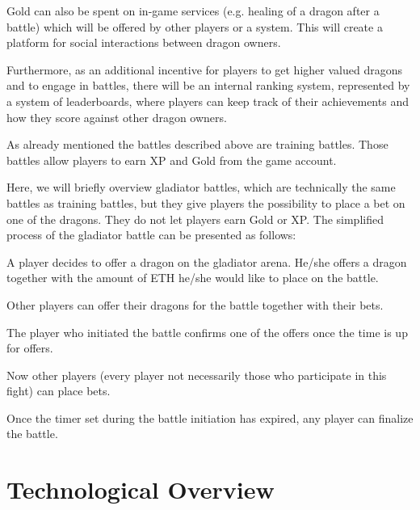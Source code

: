 \documentclass[12pt]{article}
\begin{document}
Gold can also be spent on in-game services (e.g. healing of a dragon after a battle) which will be offered by other players or a system. This will create a platform for social interactions between dragon owners.\par

Furthermore, as an additional incentive for players to get higher valued dragons and to engage in battles, there will be an internal ranking system, represented by a system of leaderboards, where players can keep track of their achievements and how they score against other dragon owners.\par

As already mentioned the battles described above are training battles. Those battles allow players to earn XP and Gold from the game account.\par

Here, we will briefly overview gladiator battles, which are technically the same battles as training battles, but they give players the possibility to place a bet on one of the dragons. They do not let players earn Gold or XP. The simplified process of the gladiator battle can be presented as follows:\par


\begin{itemize}
  \begin{samepage}
    \item A player decides to offer a dragon on the gladiator arena. He/she offers a dragon together with the amount of ETH he/she would like to place on the battle.
    \item Other players can offer their dragons for the battle together with their bets.
    \item The player who initiated the battle confirms one of the offers once the time is up for offers.
    \item Now other players (every player not necessarily those who participate in this fight) can place bets.
    \item Once the timer set during the battle initiation has expired, any player can finalize the battle.
  \end{samepage}
\end{itemize}


\newpage
\vspace{\baselineskip}\section{Technological Overview}
\label{Technological Overview}   \par
\end{document}
